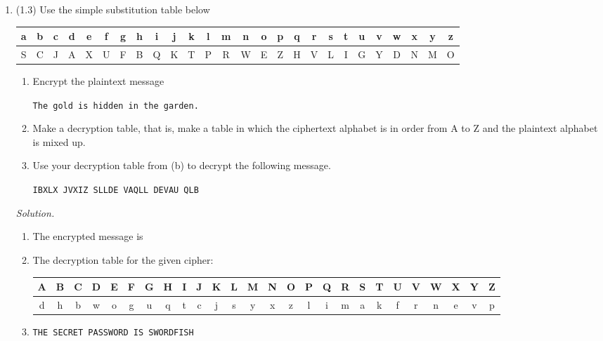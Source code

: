 \documentclass[12pt]{amsart}
\theoremstyle{definition}
\begin{document}
\begin{enumerate}
  \item (1.3) Use the simple substitution table below
  \begin{center}
	  \begin{tabular}{|c |c |c |c |c |c |c |c |c |c |c |c |c |c |c |c |c |c |c |c |c |c |c |c| c| c|}
		  \hline
		  a & b & c & d & e & f & g & h & i & j & k & l & m & n & o & 
		  p & q & r & s & t & u & v & w & x & y & z \\
		  \hline
		  S & C & J & A & X & U & F & B & Q & K & T & P & R & W & E & 
		  Z & H & V & L & I & G & Y & D & N & M & O \\
		  \hline
	  \end{tabular}
  \end{center}
  \begin{enumerate}
	  \item Encrypt the plaintext message
	  \begin{center}
		  \texttt{The gold is hidden in the garden.}
	  \end{center}
	  \item Make a decryption table, that is, make a table in which the ciphertext 
		  alphabet is in order from A to Z and the plaintext alphabet is mixed up.
	  \item Use your decryption table from (b) to decrypt the following message.
	  \begin{center}
		  \texttt{IBXLX JVXIZ SLLDE VAQLL DEVAU QLB}
	  \end{center}
  \end{enumerate}
  
  \medskip
  \textit{Solution.}

 	 \begin{enumerate}
		\item The encrypted message is
		\begin{center}
			\texttt{}
		\end{center}
	 	\item The decryption table for the given cipher:
            \begin{center}
                \hspace*{-1cm}
    			\begin{tabular}{|c |c |c |c |c |c |c |c |c |c |c |c |c |c |c |c |c |c |c |c |c |c |c |c| c| c|}
    				\hline
    				A & B & C & D & E & F & G & H & I & J & K & L & M & N & O & 
    				P & Q & R & S & T & U & V & W & X & Y & Z \\
    				\hline
    				d & h & b & w & o & g & u & q & t & c & j & s & y & x & z & 
    				l & i & m & a & k & f & r & n & e & v & p \\
    				\hline 
    			\end{tabular} 
	        \end{center} 
            \medskip
            \item \texttt{THE SECRET PASSWORD IS SWORDFISH} 
	 	\end{enumerate}


\end{enumerate}
\end{document}
